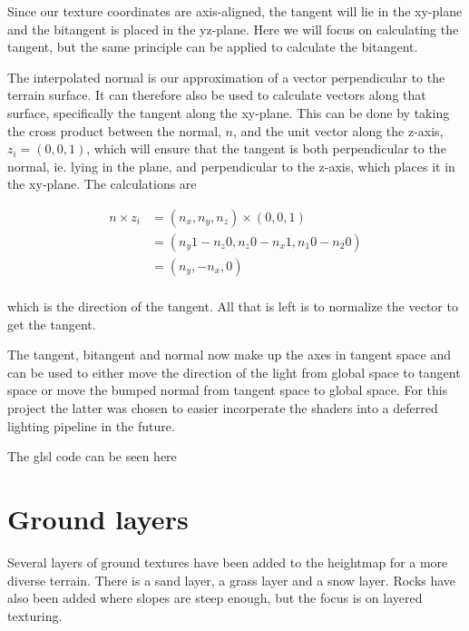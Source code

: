 Since our texture coordinates are axis-aligned, the tangent will lie
in the xy-plane and the bitangent is placed in the yz-plane. Here we
will focus on calculating the tangent, but the same principle can be
applied to calculate the bitangent.

The interpolated normal is our approximation of a vector perpendicular
to the terrain surface. It can therefore also be used to calculate
vectors along that surface, specifically the tangent along the
xy-plane. This can be done by taking the cross product between the
normal, $n$, and the unit vector along the z-axis, $z_i = (0,0,1)$, which
will ensure that the tangent is both perpendicular to the normal, ie.
lying in the plane, and perpendicular to the z-axis, which places it
in the xy-plane. The calculations are

\begin{displaymath}
  \begin{array}{rl}
  n \times z_i &= (n_x, n_y, n_z) \times (0,0,1)\\
  &= (n_y 1 - n_z 0, n_z 0 - n_x 1, n_1 0 - n_2 0) \\
  &= (n_y, - n_x, 0) \\
  \end{array}
\end{displaymath}

which is the direction of the tangent. All that is left is to
normalize the vector to get the tangent.

The tangent, bitangent and normal now make up the axes in tangent
space and can be used to either move the direction of the light from
global space to tangent space or move the bumped normal from tangent
space to global space. For this project the latter was chosen to
easier incorperate the shaders into a deferred lighting pipeline in
the future.

The glsl code can be seen here


\section{Ground layers}

Several layers of ground textures have been added to the heightmap for
a more diverse terrain. There is a sand layer, a grass layer and a
snow layer. Rocks have also been added where slopes are steep enough,
but the focus is on layered texturing.


